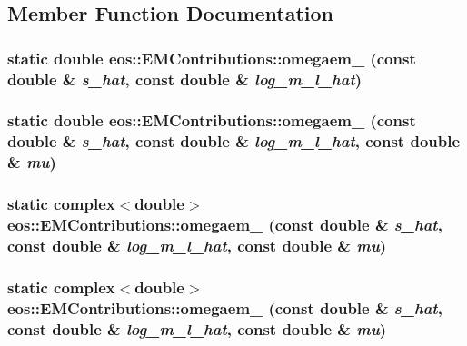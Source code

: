 \subsection{Member Function Documentation}
\hypertarget{structeos_1_1EMContributions_a0e1e2725d47f8e24a8a065b96a39e114}{
\subsubsection[{omegaem\_\-1010}]{\setlength{\rightskip}{0pt plus 5cm}static double eos::EMContributions::omegaem\_ (const double \& {\em s\_\-hat}, \/  const double \& {\em log\_\-m\_\-l\_\-hat})}}
\label{structeos_1_1EMContributions_a0e1e2725d47f8e24a8a065b96a39e114}
\hypertarget{structeos_1_1EMContributions_afdea35ec16c8b9f64ee58628d4de03d4}{
\subsubsection[{omegaem\_\-22}]{\setlength{\rightskip}{0pt plus 5cm}static double eos::EMContributions::omegaem\_ (const double \& {\em s\_\-hat}, \/  const double \& {\em log\_\-m\_\-l\_\-hat}, \/  const double \& {\em mu})}}
\label{structeos_1_1EMContributions_afdea35ec16c8b9f64ee58628d4de03d4}
\hypertarget{structeos_1_1EMContributions_a724b13f0a3c5aa60717d95cdef25d88b}{
\subsubsection[{omegaem\_\-27}]{\setlength{\rightskip}{0pt plus 5cm}static complex$<$double$>$ eos::EMContributions::omegaem\_ (const double \& {\em s\_\-hat}, \/  const double \& {\em log\_\-m\_\-l\_\-hat}, \/  const double \& {\em mu})}}
\label{structeos_1_1EMContributions_a724b13f0a3c5aa60717d95cdef25d88b}
\hypertarget{structeos_1_1EMContributions_a8b4ae92fda701eafc27649d2d40862ca}{
\subsubsection[{omegaem\_\-29}]{\setlength{\rightskip}{0pt plus 5cm}static complex$<$double$>$ eos::EMContributions::omegaem\_ (const double \& {\em s\_\-hat}, \/  const double \& {\em log\_\-m\_\-l\_\-hat}, \/  const double \& {\em mu})}}
